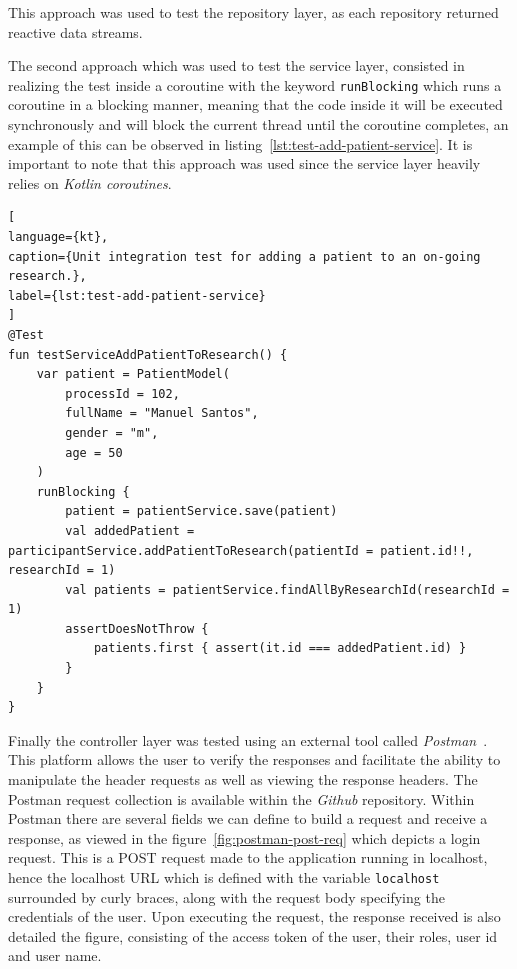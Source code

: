 This approach was used to test the repository layer, as each repository returned reactive data streams.

The second approach which was used to test the service layer, consisted in realizing the test inside a coroutine with the keyword \lstinline{runBlocking} which runs a coroutine in a blocking manner, meaning that the code inside it will be executed synchronously and will block the current thread until the coroutine completes, an example of this can be observed in listing~\ref{lst:test-add-patient-service}. It is important to note that this approach was used since the service layer heavily relies on \textit{Kotlin coroutines}.

\begin{lstlisting}[
language={kt},
caption={Unit integration test for adding a patient to an on-going research.},
label={lst:test-add-patient-service}
]
@Test
fun testServiceAddPatientToResearch() {
    var patient = PatientModel(
        processId = 102,
        fullName = "Manuel Santos",
        gender = "m",
        age = 50
    )
    runBlocking {
        patient = patientService.save(patient)
        val addedPatient = participantService.addPatientToResearch(patientId = patient.id!!, researchId = 1)
        val patients = patientService.findAllByResearchId(researchId = 1)
        assertDoesNotThrow {
            patients.first { assert(it.id === addedPatient.id) }
        }
    }
}
\end{lstlisting}

Finally the controller layer was tested using an external tool called \textit{Postman}~\cite{postman}. This platform allows the user to verify the responses and facilitate the ability to manipulate the header requests as well as viewing the response headers. The Postman request collection is available within the \textit{Github} repository.
Within Postman there are several fields we can define to build a request and receive a response, as viewed in the figure~\ref{fig:postman-post-req} which depicts a login request. This is a POST request made to the application running in localhost, hence the localhost URL which is defined with the variable \lstinline{localhost} surrounded by curly braces, along with the request body specifying the credentials of the user. Upon executing the request, the response received is also detailed the figure, consisting of the access token of the user, their roles, user id and user name.

